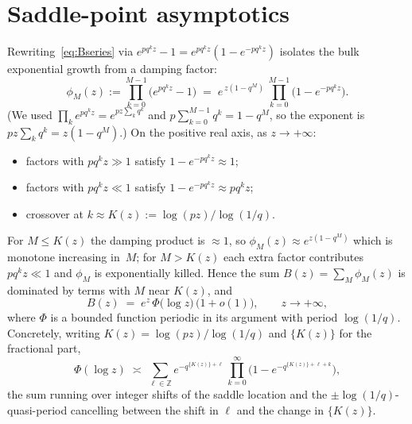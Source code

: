 \documentclass[11pt]{article}
\theoremstyle{definition}
\begin{document}
\section{Saddle-point asymptotics}\label{sec:saddle}

Rewriting~\eqref{eq:Bseries} via $e^{pq^kz}-1 = e^{pq^kz}(1-e^{-pq^kz})$
isolates the bulk exponential growth from a damping factor:
\begin{equation}\label{eq:phi}
  \phi_M(z) := \prod_{k=0}^{M-1}\bigl(e^{pq^kz}-1\bigr)
  \;=\; e^{\,z(1-q^M)}\,\prod_{k=0}^{M-1}\!\bigl(1-e^{-pq^kz}\bigr).
\end{equation}
(We used $\prod_k e^{pq^kz}=e^{pz\sum_k q^k}$ and
$p\sum_{k=0}^{M-1}q^k = 1-q^M$, so the exponent is $pz\sum_k q^k=z(1-q^M)$.)
On the
positive real axis, as $z\to+\infty$:
\begin{itemize}[leftmargin=2em]
  \item factors with $pq^kz\gg1$ satisfy $1-e^{-pq^kz}\approx 1$;
  \item factors with $pq^kz\ll1$ satisfy $1-e^{-pq^kz}\approx pq^kz$;
  \item crossover at $k\approx K(z):=\log(pz)/\log(1/q)$.
\end{itemize}
For $M\le K(z)$ the damping product is $\approx 1$, so $\phi_M(z)
\approx e^{z(1-q^M)}$ which is monotone increasing in~$M$; for $M>K(z)$
each extra factor contributes $pq^kz \ll 1$ and $\phi_M$ is exponentially
killed. Hence the sum $B(z)=\sum_M\phi_M(z)$ is dominated by terms with
$M$ near $K(z)$, and
\begin{equation}\label{eq:Basymp}
  B(z) \;=\; e^{z}\,\Phi\!\bigl(\log z\bigr)\,\bigl(1+o(1)\bigr),
  \qquad z\to+\infty,
\end{equation}
where $\Phi$ is a bounded function periodic in its argument with period
$\log(1/q)$. Concretely, writing $K(z)=\log(pz)/\log(1/q)$ and
$\{K(z)\}$ for the fractional part,
\begin{equation}\label{eq:Phi-def}
  \Phi(\log z) \;\asymp\;
  \sum_{\ell\in\mathbb{Z}}
    e^{-q^{\{K(z)\}+\ell}}\,
    \prod_{k=0}^{\infty}\!
      \bigl(1-e^{-q^{\{K(z)\}+\ell+k}}\bigr),
\end{equation}
the sum running over integer shifts of the saddle location and the
$\pm\log(1/q)$-quasi-period cancelling between the shift in $\ell$ and
the change in $\{K(z)\}$.
\end{document}
